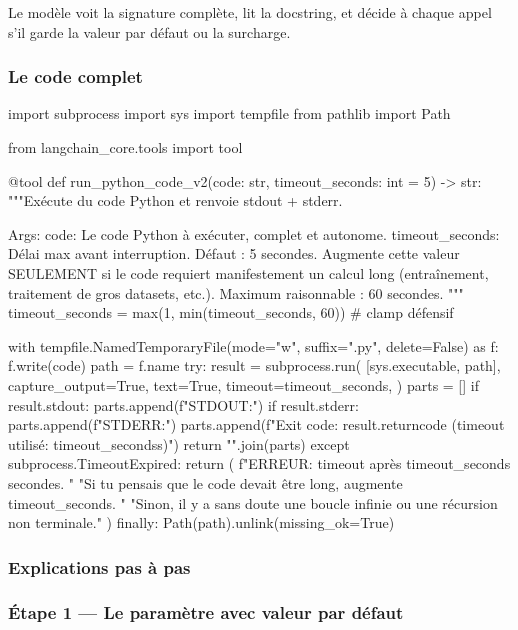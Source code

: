 \documentclass[11pt,a4paper]{article}
\begin{document}
Le modèle voit la signature complète, lit la docstring, et décide à
chaque appel s'il garde la valeur par défaut ou la surcharge.

\subsubsection{Le code complet}

\begin{pythoncode}
import subprocess
import sys
import tempfile
from pathlib import Path

from langchain_core.tools import tool


@tool
def run_python_code_v2(code: str, timeout_seconds: int = 5) -> str:
    """Exécute du code Python et renvoie stdout + stderr.

    Args:
        code: Le code Python à exécuter, complet et autonome.
        timeout_seconds: Délai max avant interruption. Défaut : 5 secondes.
            Augmente cette valeur SEULEMENT si le code requiert manifestement
            un calcul long (entraînement, traitement de gros datasets, etc.).
            Maximum raisonnable : 60 secondes.
    """
    timeout_seconds = max(1, min(timeout_seconds, 60))  # clamp défensif

    with tempfile.NamedTemporaryFile(mode="w", suffix=".py", delete=False) as f:
        f.write(code)
        path = f.name
    try:
        result = subprocess.run(
            [sys.executable, path],
            capture_output=True, text=True, timeout=timeout_seconds,
        )
        parts = []
        if result.stdout:
            parts.append(f"STDOUT:")
        if result.stderr:
            parts.append(f"STDERR:")
        parts.append(f"Exit code: {result.returncode} (timeout utilisé: {timeout_seconds}s)")
        return "\n\n".join(parts)
    except subprocess.TimeoutExpired:
        return (
            f"ERREUR: timeout après {timeout_seconds} secondes. "
            "Si tu pensais que le code devait être long, augmente timeout_seconds. "
            "Sinon, il y a sans doute une boucle infinie ou une récursion non terminale."
        )
    finally:
        Path(path).unlink(missing_ok=True)
\end{pythoncode}

\subsubsection{Explications pas à pas}

\subsubsection*{Étape 1 — Le paramètre avec valeur par défaut}
\end{document}
